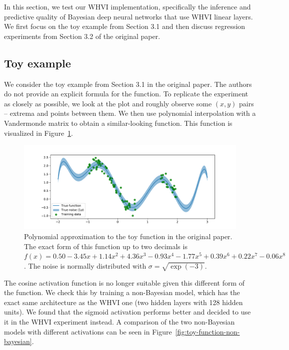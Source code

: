 In this section, we test our WHVI implementation, specifically the inference and predictive quality of Bayesian deep neural networks that use WHVI linear layers.
We first focus on the toy example from Section 3.1 and then discuss regression experiments from Section 3.2 of the original paper.

\subsection{Toy example}\label{subsec:toy-example}
We consider the toy example from Section 3.1 in the original paper.
The authors do not provide an explicit formula for the function.
To replicate the experiment as closely as possible, we look at the plot and roughly observe some $(x, y)$ pairs -- extrema and points between them.
We then use polynomial interpolation with a Vandermonde matrix to obtain a similar-looking function.
This function is visualized in Figure~\ref{fig:toy-function}.

\begin{figure}[htb]
    \centering
    \includegraphics[width=1.0\hsize]{img/toy-function}
    \caption{Polynomial approximation to the toy function in the original paper.
    The exact form of this function up to two decimals is $f(x) = 0.50 -3.45x + 1.14x^2 + 4.36x^3 -0.93x^4 -1.77x^5 + 0.39x^6 + 0.22x^7 -0.06x^8$.
    The noise is normally distributed with $\sigma = \sqrt{\exp (-3)}$.
    }
    \label{fig:toy-function}
\end{figure}

The cosine activation function is no longer suitable given this different form of the function.
We check this by training a non-Bayesian model, which has the exact same architecture as the WHVI one (two hidden layers with 128 hidden units).
We found that the sigmoid activation performs better and decided to use it in the WHVI experiment instead.
A comparison of the two non-Bayesian models with different activations can be seen in Figure~\ref{fig:toy-function-non-bayesian}.


